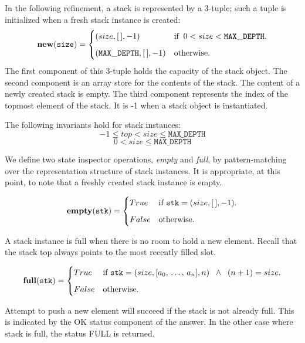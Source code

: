 \documentclass[10pt]{article}
\begin{document}
    In the following refinement, a stack is represented by a 3-tuple; such a tuple is initialized when a fresh stack instance is created:
    \[
        \mathtt{\mathbf{new}(size)} = \begin{cases} (size, [\,], -1) &\mbox{if\;\;} 0 < size < \mathtt{MAX\_DEPTH}. \vspace*{6pt}\\ 
        (\mathtt{MAX\_DEPTH}, [\,], -1) & \mbox{otherwise}. \end{cases} 
    \]
    The first component of this 3-tuple holds the capacity of the stack object. The second component is an array store for the contents of the stack. The content of a newly created stack is empty. The third component represents the index of the topmost element of the stack. It is -1 when a stack object is instantiated. 

    The following invariants hold for stack instances:
    \[
        -1 \leq top < size \leq \mathtt{MAX\_DEPTH}
    \]
    \[
        0 < size \leq \mathtt{MAX\_DEPTH}
    \]
    
    We define two state inspector operations, \emph{empty} and \emph{full}, by pattern-matching over the representation structure of stack instances. It is appropriate, at this point, to note that a freshly created stack instance is empty.

    \[
        \mathtt{\mathbf{empty}(stk)} = \begin{cases} True & \mbox{if  } \mathtt{stk} = (size, [\,], -1). \vspace*{6pt}\\ 
        False & \mbox{otherwise}. \end{cases} 
    \]

    A stack instance is full when there is no room to hold a new element. Recall that the stack top always points to the most recently filled slot.

    \[
        \mathtt{\mathbf{full}(stk)} = \begin{cases} True & \mbox{if  } \mathtt{stk} = (size, [a_0, \, \ldots, \, a_n], n)  \;\; \wedge \;\; (n+1) = size. \vspace*{6pt}\\ 
        False & \mbox{otherwise}. \end{cases} 
    \]
    
    Attempt to push a new element will succeed if the stack is not already full. This is indicated by the OK status component of the answer. In the other case where stack is full, the status FULL is returned.
\end{document}
